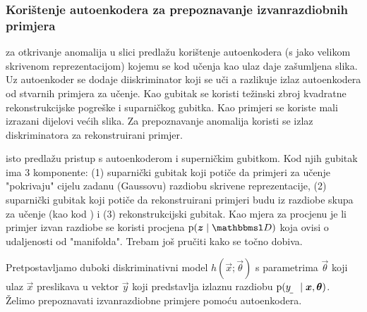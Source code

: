 \documentclass[twocolumn]{article}
\begin{document}
\subsubsection{Korištenje autoenkodera za prepoznavanje izvanrazdiobnih primjera}

\citet{Sabokrou:2018:ALOCCND} za otkrivanje anomalija u slici predlažu korištenje autoenkodera (s jako velikom skrivenom reprezentacijom) kojemu se kod učenja kao ulaz daje zašumljena slika. Uz autoenkoder se dodaje diiskriminator koji se uči a razlikuje izlaz autoenkodera od stvarnih primjera za učenje. Kao gubitak se koristi težinski zbroj kvadratne rekonstrukcijske pogreške i suparničkog gubitka. Kao primjeri se koriste mali izrazani dijelovi većih slika. Za prepoznavanje anomalija koristi se izlaz diskriminatora za rekonstruirani primjer.

\citet{Pidhorskyi:2018:GPNDAA} isto predlažu pristup s autoenkoderom i superničkim gubitkom. Kod njih gubitak ima $3$ komponente: (1) suparnički gubitak koji potiče da primjeri za učenje "pokrivaju" cijelu zadanu (Gaussovu) razdiobu skrivene reprezentacije, (2) suparnički gubitak koji potiče da rekonstruirani primjeri budu iz razdiobe skupa za učenje (kao kod \citet{Sabokrou:2018:ALOCCND}) i (3) rekonstrukcijski gubitak. Kao mjera za procjenu je li primjer izvan razdiobe se koristi procjena $\p(\vec z\mid \set D)$ koja ovisi o udaljenosti od "manifolda". Trebam još pručiti kako se točno dobiva.

Pretpostavljamo duboki diskriminativni model $h(\vec x;\vec\theta)$ s parametrima $\vec\theta$ koji ulaz $\vec x$ preslikava u vektor $\vec y$ koji predstavlja izlaznu razdiobu  $\p(\rvar y\mid \vec x, \vec\theta)$. Želimo prepoznavati izvanrazdiobne primjere pomoću autoenkodera.
\end{document}
